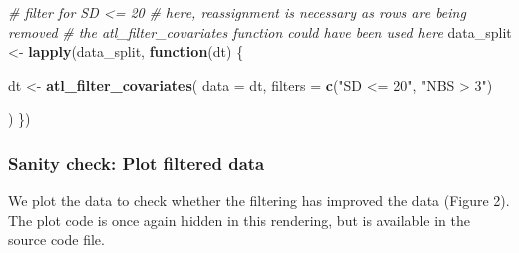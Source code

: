 \documentclass[]{scrartcl}
\newenvironment{Shaded}{}{}
\newcommand{\CommentTok}[1]{\textcolor[rgb]{0.38,0.63,0.69}{\textit{#1}}}
\newcommand{\ControlFlowTok}[1]{\textcolor[rgb]{0.00,0.44,0.13}{\textbf{#1}}}
\newcommand{\DataTypeTok}[1]{\textcolor[rgb]{0.56,0.13,0.00}{#1}}
\newcommand{\KeywordTok}[1]{\textcolor[rgb]{0.00,0.44,0.13}{\textbf{#1}}}
\newcommand{\NormalTok}[1]{#1}
\newcommand{\StringTok}[1]{\textcolor[rgb]{0.25,0.44,0.63}{#1}}
\begin{document}
\begin{Shaded}
\begin{Highlighting}[]
\CommentTok{# filter for SD <= 20}
\CommentTok{# here, reassignment is necessary as rows are being removed}
\CommentTok{# the atl_filter_covariates function could have been used here}
\NormalTok{data_split <-}\StringTok{ }\KeywordTok{lapply}\NormalTok{(data_split, }\ControlFlowTok{function}\NormalTok{(dt) \{}
  
\NormalTok{  dt <-}\StringTok{ }\KeywordTok{atl_filter_covariates}\NormalTok{(}
    \DataTypeTok{data =}\NormalTok{ dt,}
    \DataTypeTok{filters =} \KeywordTok{c}\NormalTok{(}\StringTok{"SD <= 20"}\NormalTok{,}
                \StringTok{"NBS > 3"}\NormalTok{)}
    
\NormalTok{  )}
\NormalTok{\})}
\end{Highlighting}
\end{Shaded}

\hypertarget{sanity-check-plot-filtered-data}{%
\subsubsection{Sanity check: Plot filtered data}\label{sanity-check-plot-filtered-data}}

We plot the data to check whether the filtering has improved the data (Figure 2).
The plot code is once again hidden in this rendering, but is available in the source code file.
\end{document}
